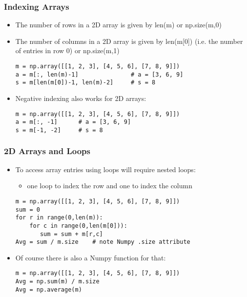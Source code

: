 \documentclass[english,14pt]{beamer}
\begin{document}
\begin{frame}[fragile]
\frametitle{Indexing Arrays}
	\begin{itemize}
        \item The number of rows in a 2D array is given by len(m) or np.size(m,0)
        \item The number of columns in a 2D array is given by len(m[0])  (i.e. the number of entries in row 0) or np.size(m,1)
\begin{lstlisting}[style=CStyle]
m = np.array([[1, 2, 3], [4, 5, 6], [7, 8, 9]])
a = m[:, len(m)-1]               # a = [3, 6, 9] 
s = m[len(m[0])-1, len(m)-2]     # s = 8
\end{lstlisting}

		\item Negative indexing also works for 2D arrays:
\begin{lstlisting}[style=CStyle]
m = np.array([[1, 2, 3], [4, 5, 6], [7, 8, 9]])
a = m[:, -1]      # a = [3, 6, 9] 
s = m[-1, -2]     # s = 8
\end{lstlisting}

	\end{itemize}
\end{frame}


\begin{frame}[fragile]
\frametitle{2D Arrays and Loops}
	\begin{itemize}
		\item To access array entries using loops will require nested loops: 
	  	\begin{itemize}
		    \item one loop to index the row and one to index the column
		\end{itemize}
\begin{lstlisting}[style=CStyle]
m = np.array([[1, 2, 3], [4, 5, 6], [7, 8, 9]])
sum = 0
for r in range(0,len(m)):
    for c in range(0,len(m[0])):
       sum = sum + m[r,c]
Avg = sum / m.size    # note Numpy .size attribute
\end{lstlisting}
        \item Of course there is also a Numpy function for that: 
\begin{lstlisting}[style=CStyle]
m = np.array([[1, 2, 3], [4, 5, 6], [7, 8, 9]])
Avg = np.sum(m) / m.size
Avg = np.average(m)
\end{lstlisting}
	\end{itemize}
\end{frame}
\end{document}
